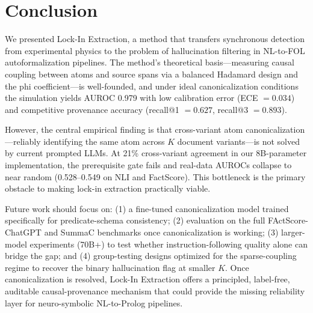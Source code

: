 \documentclass[11pt,letterpaper]{article}
\begin{document}
\section{Conclusion}

We presented Lock-In Extraction, a method that transfers synchronous detection from experimental physics to the problem
of hallucination filtering in NL-to-FOL autoformalization pipelines. The method's theoretical
basis---measuring causal coupling between atoms and source spans via a balanced Hadamard design and the phi
coefficient---is well-founded, and under ideal canonicalization conditions the simulation yields AUROC 0.979 with low
calibration error (ECE $= 0.034$) and competitive provenance accuracy (recall@1 $= 0.627$, recall@3 $= 0.893$).

However, the central empirical finding is that cross-variant atom canonicalization---reliably identifying the same atom
across $K$ document variants---is not solved by current prompted LLMs. At 21\% cross-variant agreement in our
8B-parameter implementation, the prerequisite gate fails and real-data AUROCs collapse to near random (0.528--0.549 on
NLI and FactScore). This bottleneck is the primary obstacle to making lock-in extraction practically viable.

Future work should focus on: (1) a fine-tuned canonicalization model trained specifically for predicate-schema
consistency; (2) evaluation on the full FActScore-ChatGPT and SummaC benchmarks once canonicalization is working; (3)
larger-model experiments (70B+) to test whether instruction-following quality alone can bridge the gap; and (4)
group-testing designs optimized for the sparse-coupling regime to recover the binary hallucination flag at smaller $K$.
Once canonicalization is resolved, Lock-In Extraction offers a principled, label-free, auditable causal-provenance
mechanism that could provide the missing reliability layer for neuro-symbolic NL-to-Prolog pipelines.



\end{document}
